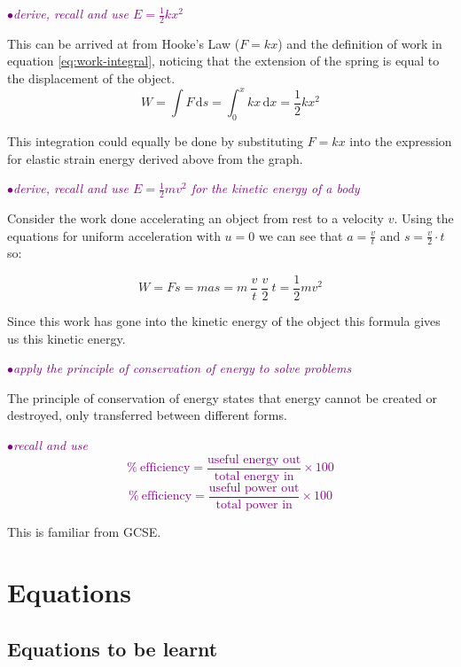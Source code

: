\documentclass[a4paper,11pt,twoside]{memoir}
\newcommand{\ud}{\,\mathrm{d}}
\newcounter{spec}[chapter]
\newcommand{\spec}[1]{\Needspace{5\baselineskip}\textcolor{purple}{$\bullet$\hspace{0.5cm}\textit{#1}}}
\begin{document}
\spec{derive, recall and use $E=\frac{1}{2}kx^2$}

This can be arrived at from Hooke's Law ($F=kx$) and the definition of work in equation \ref{eq:work-integral}, noticing that the extension of the spring is equal to the displacement of the object.
\[ W = \int F \ud s = \int_0^x kx \ud x = \frac{1}{2}kx^2 \]

This integration could equally be done by substituting $F=kx$ into the expression for elastic strain energy derived above from the graph.

\spec{derive, recall and use $E=\frac{1}{2}mv^2$ for the kinetic energy of a body}

Consider the work done accelerating an object from rest to a velocity $v$. Using the equations for uniform acceleration with $u=0$ we can see that $ a = \frac{v}{t} $ and $ s = \frac{v}{2}\cdot t $ so:

\[ W = Fs = mas = m\ \frac{v}{t}\ \frac{v}{2}\ t = \frac{1}{2}mv^2 \]

Since this work has gone into the kinetic energy of the object this formula gives us this kinetic energy.

\spec{apply the principle of conservation of energy to solve problems}

The principle of conservation of energy states that energy cannot be created or destroyed, only transferred between different forms.

\spec{recall and use \[\%\  \text{efficiency} = \frac{\text{useful energy out}}{\text{total energy in}} \times 100\]
\[\%\  \text{efficiency} = \frac{\text{useful power out}}{\text{total power in}} \times 100\]}

This is familiar from GCSE.

% 
% 
% 
% 
% 
% 
% 
% 
% 
% 





\appendix
\chapter{Equations}
\setlength{\LTleft}{0pt}

\section{Equations to be learnt}
\end{document}
